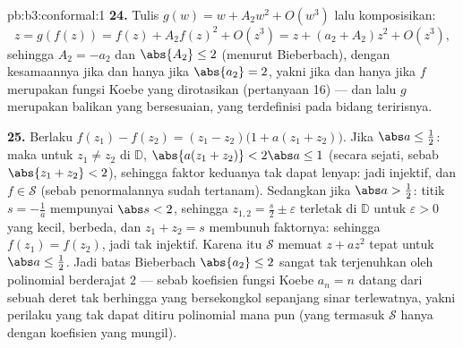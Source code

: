 \begin{solution}{pb:b3:conformal:1}
\textbf{24.} Tulis $g(w) = w + A_2w^2 + O(w^3)$ lalu komposisikan:
\[
z = g(f(z)) = f(z) + A_2f(z)^2 + O(z^3)
= z + (a_2 + A_2)z^2 + O(z^3),
\]
sehingga $A_2 = -a_2$ dan $\abs{A_2} \leq 2$ (menurut Bieberbach), dengan
kesamaannya jika dan hanya jika $\abs{a_2} = 2$, yakni jika dan hanya jika $f$ merupakan fungsi
Koebe yang dirotasikan (pertanyaan 16) --- dan lalu $g$ merupakan
balikan yang bersesuaian, yang terdefinisi pada bidang teririsnya.

\textbf{25.} Berlaku $f(z_1) - f(z_2) = (z_1 - z_2)\bigl(1 + a(z_1 +
z_2)\bigr)$. Jika $\abs a \leq \frac12$: maka untuk $z_1 \neq z_2$ di
$\mathbb D$, $\abs{a(z_1 + z_2)} < 2\abs a \leq 1$ (secara sejati, sebab
$\abs{z_1 + z_2} < 2$), sehingga faktor keduanya tak dapat lenyap:
jadi injektif, dan $f \in \mathcal S$ (sebab penormalannya sudah
tertanam). Sedangkan jika $\abs a > \frac12$: titik $s =
-\frac1a$ mempunyai $\abs s < 2$, sehingga $z_{1,2} = \frac s2 \pm
\varepsilon$ terletak di $\mathbb D$ untuk $\varepsilon > 0$ yang kecil,
berbeda, dan $z_1 + z_2 = s$ membunuh faktornya: sehingga $f(z_1)
= f(z_2)$, jadi tak injektif. Karena itu $\mathcal S$ memuat $z +
az^2$ tepat untuk $\abs a \leq \frac12$. Jadi batas Bieberbach
$\abs{a_2} \leq 2$ sangat tak terjenuhkan oleh
polinomial berderajat $2$ --- sebab koefisien fungsi Koebe
$a_n = n$ datang dari sebuah deret tak berhingga yang bersekongkol
sepanjang sinar terlewatnya, yakni perilaku yang tak dapat ditiru polinomial
mana pun (yang termasuk $\mathcal S$ hanya dengan koefisien yang mungil).

\end{solution}

